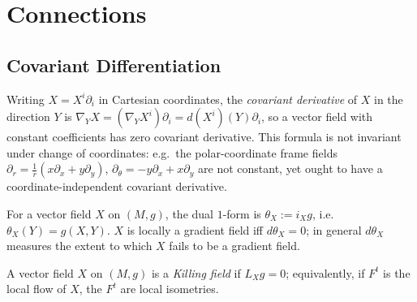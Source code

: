 \section{Connections}

\subsection{Covariant Differentiation}

\begin{definition}
  \label{def:pet-ch2-covariant-derivative-euclidean}
  \leanok
  Writing $X=X^i\partial_i$ in Cartesian coordinates, the \emph{covariant
  derivative} of $X$ in the direction $Y$ is
  $\nabla_YX=(\nabla_YX^i)\partial_i=d(X^i)(Y)\partial_i$, so a vector field with
  constant coefficients has zero covariant derivative. This formula is not
  invariant under change of coordinates: e.g.\ the polar-coordinate frame
  fields $\partial_r=\frac1r(x\partial_x+y\partial_y)$, $\partial_\theta=-y\partial_x+x\partial_y$
  are not constant, yet ought to have a coordinate-independent covariant
  derivative.
\end{definition}

\begin{definition}
  \label{def:pet-ch2-dual-one-form}
  \leanok
  For a vector field $X$ on $(M,g)$, the dual $1$-form is
  $\theta_X:=i_Xg$, i.e.\ $\theta_X(Y)=g(X,Y)$. $X$ is locally a gradient field
  iff $d\theta_X=0$; in general $d\theta_X$ measures the extent to which $X$
  fails to be a gradient field.
\end{definition}

\begin{definition}
  \label{def:pet-ch2-killing-field}
  \leanok
  A vector field $X$ on $(M,g)$ is a \emph{Killing field} if $L_Xg=0$;
  equivalently, if $F^t$ is the local flow of $X$, the $F^t$ are local
  isometries.
\end{definition}

